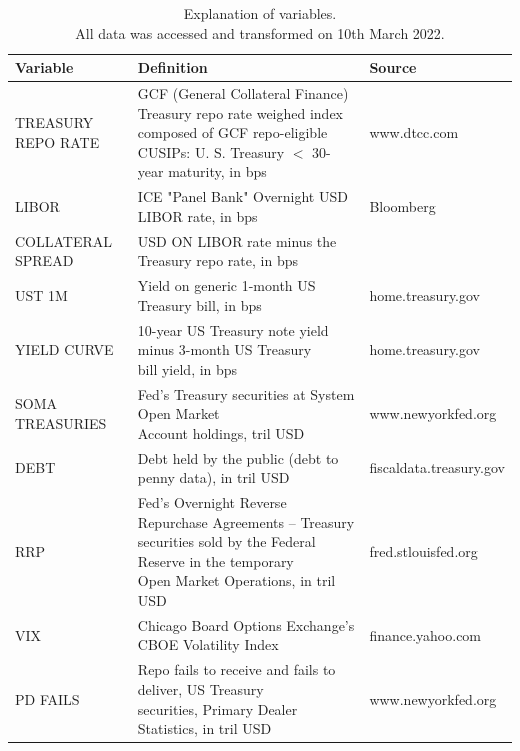 \documentclass[11pt,a4paper,english,oneside]{article}
\begin{document}
\begin{table} \centering
\caption{Explanation of variables.\\
\label{table:variables}
  All data was accessed and transformed on 10th March 2022.}
{\renewcommand{\arraystretch}{2.2} 
\begin{tabular}{lll}
\toprule
  \textbf{Variable} & \textbf{Definition} & \textbf{Source} \\
\midrule
  TREASURY REPO RATE &  \makecell[l]{GCF (General Collateral Finance) Treasury repo rate\\weighed index composed of GCF repo-eligible CUSIPs:\\U. S. Treasury $<$ 30-year maturity, in bps} & www.dtcc.com\\
\hline
  LIBOR & ICE "Panel Bank" Overnight USD LIBOR rate, in bps & Bloomberg\\
\hline
  COLLATERAL SPREAD & USD ON LIBOR rate minus the Treasury repo rate, in bps & \\
\hline
  UST 1M & Yield on generic 1-month US Treasury bill, in bps & home.treasury.gov\\
\hline
  YIELD CURVE & \makecell[l]{10-year US Treasury note yield  minus 3-month US Treasury\\bill yield, in bps} & home.treasury.gov\\
\hline
  SOMA TREASURIES & \makecell[l]{Fed's Treasury securities at System Open Market\\Account holdings, tril USD} & www.newyorkfed.org\\
\hline
  DEBT & Debt held by the public (debt to penny data), in tril USD & fiscaldata.treasury.gov\\
\hline
  RRP & \makecell[l]{Fed's Overnight Reverse Repurchase Agreements -- Treasury\\securities sold by the Federal Reserve in the temporary\\Open Market Operations, in tril USD} & fred.stlouisfed.org\\
\hline
  VIX & Chicago Board Options Exchange's CBOE Volatility Index & finance.yahoo.com\\
\hline
  PD FAILS & \makecell[l]{Repo fails to receive and fails to deliver, US Treasury\\securities, Primary Dealer Statistics, in tril USD} & www.newyorkfed.org \\
  \bottomrule
\end{tabular}}
\end{table}
\end{document}
